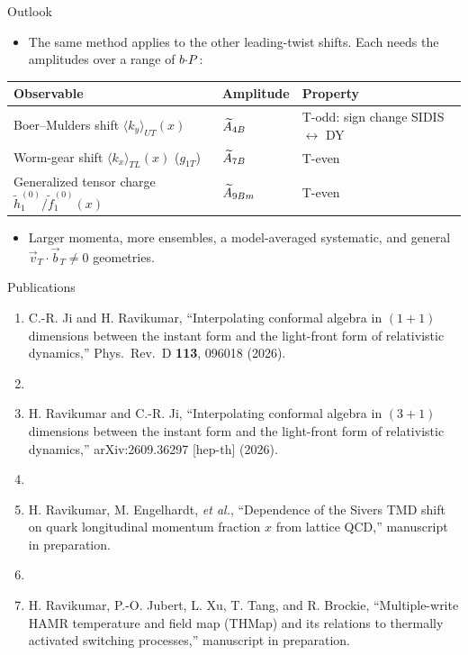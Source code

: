 \begin{frame}{Outlook}
  \begin{itemize}
    \item The same method applies to the other leading-twist shifts. Each needs the amplitudes over a range of $b{\cdot} P$:
  \end{itemize}
  \vspace{1mm}
  \centering
  \renewcommand{\arraystretch}{1.25}
  \begin{tabular}{lll}
    \toprule
    Observable & Amplitude & Property \\
    \midrule
    Boer--Mulders shift $\langle k_y\rangle_{UT}(x)$ & $\widetilde{A}_{4B}$ & T-odd: sign change SIDIS $\leftrightarrow$ DY \\
    Worm-gear shift $\langle k_x\rangle_{TL}(x)$ ($g_{1T}$) & $\widetilde{A}_{7B}$ & T-even \\
    Generalized tensor charge $\tilde h_1^{(0)}/\tilde f_1^{(0)}(x)$ & $\widetilde{A}_{9Bm}$ & T-even \\
    \bottomrule
  \end{tabular}
  \raggedright
  \begin{itemize}
    \item Larger momenta, more ensembles, a model-averaged systematic, and general $\vec v_T\cdot\vec b_T\neq0$ geometries.
  \end{itemize}
\end{frame}

\begin{frame}{Publications}
  \small
  \begin{enumerate}
    \item C.-R. Ji and H. Ravikumar, ``Interpolating conformal algebra in $(1+1)$ dimensions between the instant form and the light-front form of relativistic dynamics,'' Phys.\ Rev.\ D \textbf{113}, 096018 (2026).
    \item[\vspace{2mm}]
    \item H. Ravikumar and C.-R. Ji, ``Interpolating conformal algebra in $(3+1)$ dimensions between the instant form and the light-front form of relativistic dynamics,'' arXiv:2609.36297 [hep-th] (2026).
    \item[\vspace{2mm}]
    \item H. Ravikumar, M. Engelhardt, \textit{et al.}, ``Dependence of the Sivers TMD shift on quark longitudinal momentum fraction $x$ from lattice QCD,'' manuscript in preparation.
    \item[\vspace{2mm}]
    \item H. Ravikumar, P.-O. Jubert, L. Xu, T. Tang, and R. Brockie, ``Multiple-write HAMR temperature and field map (THMap) and its relations to thermally activated switching processes,'' manuscript in preparation.
  \end{enumerate}
\end{frame}


